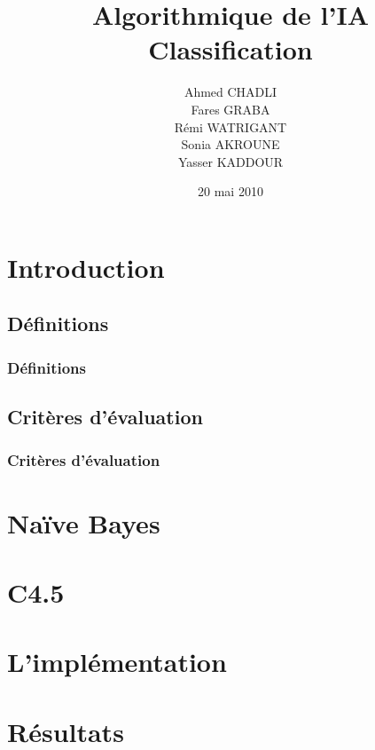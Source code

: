\documentclass[a4paper, 10pt]{beamer}
\title{Algorithmique de l'IA \\Classification}
\author{Ahmed CHADLI\\Fares GRABA\\Rémi WATRIGANT\\Sonia AKROUNE\\Yasser KADDOUR}
\date{20 mai 2010}
\begin{document}
\maketitle


\tableofcontents[hideallsubsections]

\section{Introduction}
  \subsection{Définitions}
  \begin{frame}
   \frametitle{Définitions}

  \end{frame}


  \subsection{Critères d'évaluation}
  \begin{frame}
   \frametitle{Critères d'évaluation}

  \end{frame}

\section{Naïve Bayes}
  


\section{C4.5}

\section{L'implémentation}

\section{Résultats}
\end{document}
